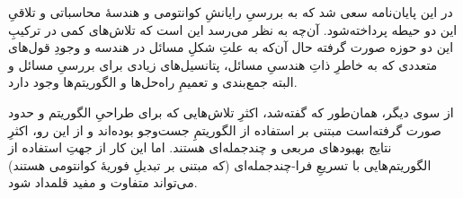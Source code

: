 \documentclass[a4paper,12pt]{article}
\begin{document}
در این پایان‌نامه سعی شد که به بررسیِ رایانشِ کوانتومی و هندسهٔ محاسباتی و تلاقیِ این دو حیطه پرداخته‌شود. آن‌چه به نظر می‌رسد این است که تلاش‌های کمی در ترکیبِ این دو حوزه صورت گرفته حال آن‌که به علتِ شکلِ مسائل در هندسه و وجودِ قول‌های متعددی که به خاطرِ ذاتِ هندسیِ مسائل، پتانسیل‌های زیادی برای بررسیِ مسائل و البته جمع‌بندی و تعمیمِ راه‌حل‌ها و الگوریتم‌ها وجود دارد.

از سوی دیگر، همان‌طور که گفته‌شد، اکثرِ تلاش‌هایی که برای طراحیِ الگوریتم و حدود صورت گرفته‌است مبتنی بر استفاده از الگوریتمِ جست‌وجو بوده‌اند و از این رو، اکثرِ نتایج بهبودهای مربعی و چندجمله‌ای هستند. اما این کار از جهتِ استفاده از الگوریتم‌هایی با تسریعِ فرا-چندجمله‌ای (که مبتنی بر تبدیلِ فوریهٔ کوانتومی هستند) می‌تواند متفاوت و مفید قلمداد شود.


\printbibliography[heading=none]
\end{document}
